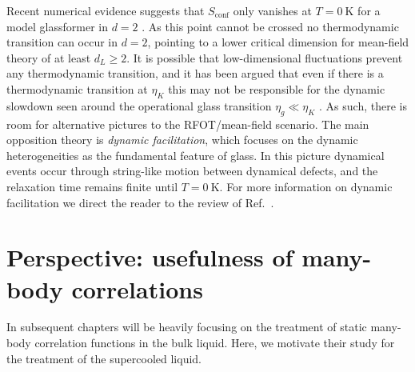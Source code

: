 \documentclass[11pt,twoside]{report}
\begin{document}
Recent numerical evidence suggests that $S_\mathrm{conf}$ only vanishes at $T=\SI{0}{\kelvin}$ for a model glassformer in $d=2$ \cite{BerthierNC2019}.
As this point cannot be crossed no thermodynamic transition can occur in $d = 2$, pointing to a lower critical dimension for mean-field theory of at least $d_L \ge 2$.
It is possible that low-dimensional fluctuations prevent any thermodynamic transition, and it has been argued that even if there is a thermodynamic transition at $\eta_K$ this may not be responsible for the dynamic slowdown seen around the operational glass transition $\eta_g \ll \eta_K$ \cite{WyartPRL2017}.
As such, there is room for alternative pictures to the RFOT/mean-field scenario.
The main opposition theory is \emph{dynamic facilitation}, which focuses on the dynamic heterogeneities as the fundamental feature of glass.
In this picture dynamical events occur through string-like motion between dynamical defects, and the relaxation time remains finite until $T = \SI{0}{\kelvin}$.
For more information on dynamic facilitation we direct the reader to the review of Ref.\ \cite{ChandlerARPC2010}.


\section{Perspective: usefulness of many-body correlations}
\label{sec:correlation-perspective}

In subsequent chapters will be heavily focusing on the treatment of static many-body correlation functions in the bulk liquid.
Here, we motivate their study for the treatment of the supercooled liquid.
\end{document}
